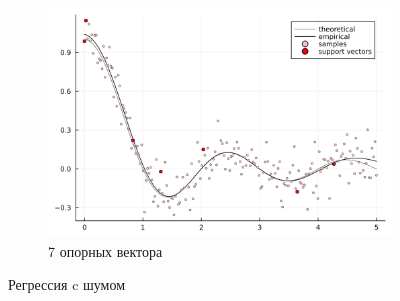 \documentclass{beamer}
\begin{document}
\begin{frame}
\begin{figure}
\begin{subfigure}{0.4\textwidth}
			\includegraphics[width=\linewidth]{../model_noise7.png}
			\caption{7 опорных вектора}
		\end{subfigure}
		\caption{Регрессия c шумом}
	\end{figure}

\end{frame}
\end{document}
